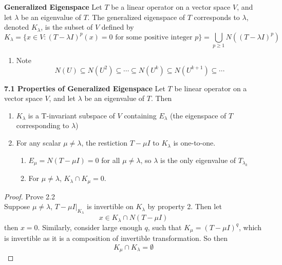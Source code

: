 \documentclass[11pt]{article}
\begin{document}
\begin{defn*}
    \textbf{Generalized Eigenspace} Let $T$ be a linear operator on a vector space $V$, and let $\lambda$ be an eigenvalue of $T$. The generalized eigenspace of $T$ corresponds to $\lambda$, denoted $K_{\lambda}$, is the subset of $V$ defined by 
    \[
        K_{\lambda} = 
        \{ x\in V: (T-\lambda I)^p(x) = 0 \text{ for some positive integer } p\} = 
        \bigcup_{p\geq 1} N((T-\lambda I)^p)
    \]
    \begin{enumerate}
        \item Note 
        \[
            N(U) \subseteq N(U^2) \subseteq \cdots \subseteq N(U^k) \subseteq N(U^{k+1}) \subseteq \cdots
        \]
    \end{enumerate}
\end{defn*}


\begin{theorem*}
    \textbf{7.1 Properties of Generalized Eigenspace} Let $T$ be linear operator on a vector space $V$, and let $\lambda$ be an eigenvalue of $T$. Then 
    \begin{enumerate}
        \item $K_{\lambda}$ is a T-invariant subspace of $V$ containing $E_{\lambda}$ (the eigenspace of $T$ corresponding to $\lambda$)
        \item For any scalar $\mu \neq \lambda$, the restiction $T - \mu I$ to $K_{\lambda}$ is one-to-one.
        \begin{enumerate}
            \item $E_{\mu} = N(T-\mu I) = 0$ for all $\mu \neq \lambda$, so $\lambda$ is the only eigenvalue of $T_{\lambda_k}$
            \item For $\mu \neq \lambda$, $K_{\lambda} \cap K_{\mu} = 0$. 
        \end{enumerate}
    \end{enumerate}
    \begin{proof}
        Prove 2.2 \\
        Suppose $\mu \neq \lambda$, $T-\mu I |_{K_{\lambda}}$ is invertible on $K_{\lambda}$ by property 2. Then let 
        \[
            x \in K_{\lambda} \cap N(T-\mu I)    
        \]
        then $x = 0$. Similarly, consider large enough $q$, such that $K_{\mu} = (T-\mu I)^q$, which is invertible as it is a composition of invertible transformation. So then 
        \[
            K_{\mu} \cap K_{\lambda} = \emptyset
        \]
    \end{proof}
\end{theorem*}
\end{document}
